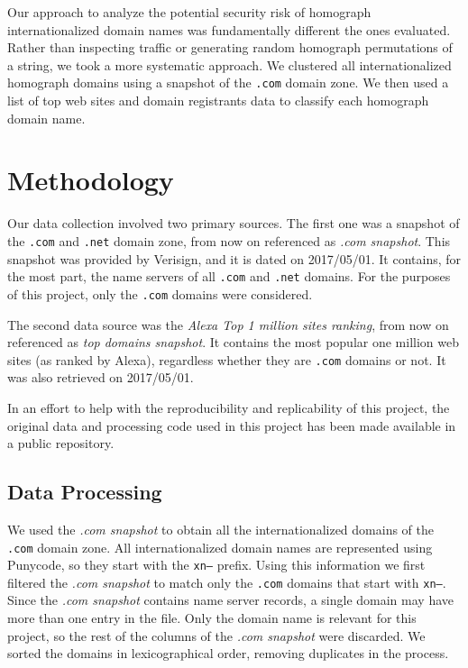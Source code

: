 \documentclass[letterpaper,twocolumn,10pt]{article}
\begin{document}
Our approach to analyze the potential security risk of homograph internationalized domain names was fundamentally different the ones evaluated.
Rather than inspecting traffic or generating random homograph permutations of a string, we took a more systematic approach.
We clustered all internationalized homograph domains using a snapshot of the \texttt{.com} domain zone.
We then used a list of top web sites and domain registrants data to classify each homograph domain name.

\section{Methodology}
Our data collection involved two primary sources.
The first one was a snapshot of the \texttt{.com} and \texttt{.net} domain zone, from now on referenced as \textit{.com snapshot}.
This snapshot was provided by Verisign, and it is dated on 2017/05/01.
It contains, for the most part, the name servers of all \texttt{.com} and \texttt{.net} domains.
For the purposes of this project, only the \texttt{.com} domains were considered.

The second data source was the \textit{Alexa Top 1 million sites ranking}, from now on referenced as \textit{top domains snapshot}.
It contains the most popular one million web sites (as ranked by Alexa), regardless whether they are \texttt{.com} domains or not.
It was also retrieved on 2017/05/01.

In an effort to help with the reproducibility and replicability of this project, the original data and processing code used in this project has been made available in a public repository.

\subsection{Data Processing}
We used the \textit{.com snapshot} to obtain all the internationalized domains of the \texttt{.com} domain zone.
All internationalized domain names are represented using Punycode, so they start with the \texttt{xn--} prefix.
Using this information we first filtered the \textit{.com snapshot} to match only the \texttt{.com} domains that start with \texttt{xn--}.
Since the \textit{.com snapshot} contains name server records, a single domain may have more than one entry in the file.
Only the domain name is relevant for this project, so the rest of the columns of the \textit{.com snapshot} were discarded.
We sorted the domains in lexicographical order, removing duplicates in the process.
\end{document}
